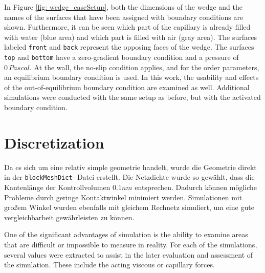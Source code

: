 In Figure \ref{fig: wedge_caseSetup}, both the dimensions of the wedge and the names of the surfaces that have been assigned with boundary conditions are shown. Furthermore, it can be seen which part of the capillary is already filled with water (blue area) and which part is filled with air (gray area). The surfaces labeled \texttt{front} and \texttt{back} represent the opposing faces of the wedge. The surfaces \texttt{top} and \texttt{bottom} have a zero-gradient boundary condition and a pressure of \(0\,Pascal\). At the wall, the no-slip condition applies, and for the order parameters, an equilibrium boundary condition is used. In this work, the usability and effects of the out-of-equilibrium boundary condition are examined as well. Additional simulations were conducted with the same setup as before, but with the activated boundary condition. 
\section{Discretization}
Da es sich um eine relativ simple geometrie handelt, wurde die Geometrie direkt in der \texttt{blockMeshDict}- Datei erstellt. Die Netzdichte wurde so gewählt, dass die Kantenlänge der Kontrollvolumen $0.1nm$ entsprechen. Dadurch können mögliche Probleme durch geringe Kontaktwinkel minimiert werden. Simulationen mit großem Winkel wurden ebenfalls mit gleichem Rechnetz simuliert, um eine gute vergleichbarbeit gewährleisten zu können. 




One of the significant advantages of simulation is the ability to examine areas that are difficult or impossible to measure in reality. For each of the simulations, several values were extracted to assist in the later evaluation and assessment of the simulation. These include the acting viscous or capillary forces.



